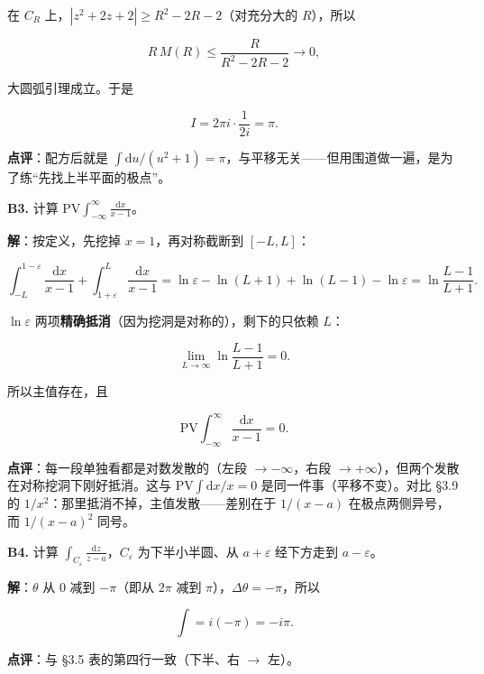 \documentclass[11pt]{ctexart}
\begin{document}
在 $C_R$ 上，$|z^{2}+2z+2|\ge R^{2}-2R-2$（对充分大的 $R$），所以

$$
R\,M(R)\le\frac{R}{R^{2}-2R-2}\to0 ,
$$

大圆弧引理成立。于是

$$
I=2\pi i\cdot\frac{1}{2i}=\pi .
$$

\textbf{点评}：配方后就是 $\int\mathrm{d}u/(u^{2}+1)=\pi$，与平移无关——但用围道做一遍，是为了练“先找上半平面的极点”。

\textbf{B3.} 计算 $\displaystyle\mathrm{PV}\!\int_{-\infty}^{\infty}\frac{\mathrm{d}x}{x-1}$。

\textbf{解}：按定义，先挖掉 $x=1$，再对称截断到 $[-L,L]$：

$$
\int_{-L}^{1-\varepsilon}\frac{\mathrm{d}x}{x-1}+\int_{1+\varepsilon}^{L}\frac{\mathrm{d}x}{x-1}
=\ln\varepsilon-\ln(L+1)+\ln(L-1)-\ln\varepsilon
=\ln\frac{L-1}{L+1}.
$$

$\ln\varepsilon$ 两项\textbf{精确抵消}（因为挖洞是对称的），剩下的只依赖 $L$：

$$
\lim_{L\to\infty}\ln\frac{L-1}{L+1}=0 .
$$

所以主值存在，且

$$
\mathrm{PV}\!\int_{-\infty}^{\infty}\frac{\mathrm{d}x}{x-1}=0 .
$$

\textbf{点评}：每一段单独看都是对数发散的（左段 $\to-\infty$，右段 $\to+\infty$），但两个发散在对称挖洞下刚好抵消。这与 $\mathrm{PV}\int\mathrm{d}x/x=0$ 是同一件事（平移不变）。对比 §3.9 的 $1/x^{2}$：那里抵消不掉，主值发散——差别在于 $1/(x-a)$ 在极点两侧异号，而 $1/(x-a)^{2}$ 同号。

\textbf{B4.} 计算 $\displaystyle\int_{C_\varepsilon}\frac{\mathrm{d}z}{z-a}$，$C_\varepsilon$ 为下半小半圆、从 $a+\varepsilon$ 经下方走到 $a-\varepsilon$。

\textbf{解}：$\theta$ 从 $0$ 减到 $-\pi$（即从 $2\pi$ 减到 $\pi$），$\Delta\theta=-\pi$，所以

$$
\int=i(-\pi)=-i\pi .
$$

\textbf{点评}：与 §3.5 表的第四行一致（下半、右 $\to$ 左）。
\end{document}
